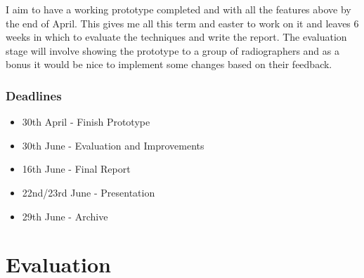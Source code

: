 \documentclass[
  oneside,
  11pt, a4paper,
  footinclude=true,
  headinclude=true,
  cleardoublepage=empty
]{scrbook}
\begin{document}
I aim to have a working prototype completed and with all the features above by the end of April. This gives me all this term and easter to work on it and leaves 6 weeks in which to evaluate the techniques and write the report. The evaluation stage will involve showing the prototype to a group of radiographers and as a bonus it would be nice to implement some changes based on their feedback.

\subsection*{Deadlines}
\begin{itemize}
	\item[] 30th April - Finish Prototype
	\item[] 30th June - Evaluation and Improvements
	\item[] 16th June - Final Report
	\item[] 22nd/23rd June - Presentation
	\item[] 29th June - Archive
\end{itemize}

\chapter{Evaluation}

 

    
\end{document}
